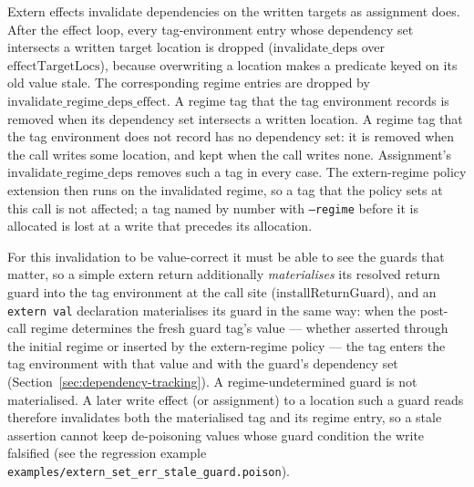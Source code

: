 \documentclass[12pt]{article}
\begin{document}
Extern effects invalidate dependencies on the written targets as assignment
does. After the effect loop, every tag-environment entry whose dependency set
intersects a written target location is dropped (\(\mathrm{invalidate\_deps}\)
over \(\mathrm{effectTargetLocs}\)), because overwriting a location makes a
predicate keyed on its old value stale. The corresponding regime entries are
dropped by \(\mathrm{invalidate\_regime\_deps\_effect}\). A regime tag that the
tag environment records is removed when its dependency set intersects a written
location. A regime tag that the tag environment does not record has no
dependency set: it is removed when the call writes some location, and kept when
the call writes none. Assignment's \(\mathrm{invalidate\_regime\_deps}\) removes
such a tag in every case. The extern-regime policy extension then runs on the
invalidated regime, so a tag that the policy sets at this call is not affected;
a tag named by number with \texttt{--regime} before it is allocated is lost at
a write that precedes its allocation.

For this invalidation to be value-correct it must be able to see the guards
that matter, so a simple extern return additionally \emph{materialises} its
resolved return guard into the tag environment at the call site
(\(\mathrm{installReturnGuard}\)), and an \texttt{extern val} declaration
materialises its guard in the same way: when the post-call regime determines the
fresh guard tag's value --- whether asserted through the initial regime or
inserted by the extern-regime policy --- the tag enters the tag environment
with that value and with the guard's dependency set
(Section~\ref{sec:dependency-tracking}). A regime-undetermined guard is not
materialised. A later write
effect (or assignment) to a location such a guard reads therefore invalidates
both the materialised tag and its regime entry, so a stale assertion cannot
keep de-poisoning values whose guard condition the write falsified (see
the regression example
\texttt{examples/extern\_set\_err\_stale\_guard.poison}).
\end{document}

